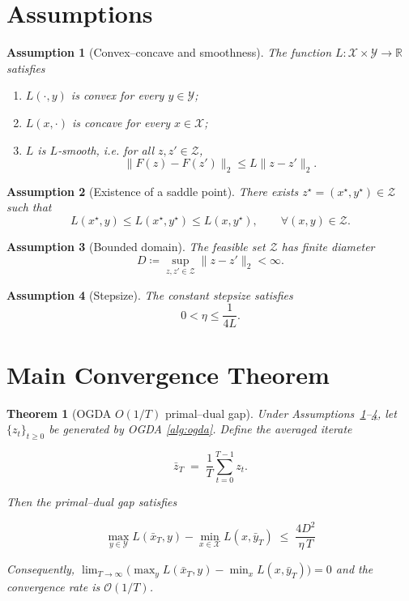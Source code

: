 \documentclass{article}
\newtheorem{theorem}{Theorem}
\newtheorem{assumption}{Assumption}
\newcommand{\R}{\mathbb{R}}
\begin{document}
\section{Assumptions}
\begin{assumption}[Convex–concave and smoothness]\label{ass:convexconcave}
The function $L:\mathcal X\times\mathcal Y\to\R$ satisfies
\begin{enumerate}[label=(\alph*)]
\item $L(\cdot,y)$ is convex for every $y\in\mathcal Y$;
\item $L(x,\cdot)$ is concave for every $x\in\mathcal X$;
\item $L$ is $L$‑smooth, i.e. for all $z,z'\in\mathcal Z$,
\[
\|F(z)-F(z')\|_2\le L\|z-z'\|_2 .
\]
\end{enumerate}
\end{assumption}

\begin{assumption}[Existence of a saddle point]\label{ass:saddle}
There exists $z^\star=(x^\star,y^\star)\in\mathcal Z$ such that
\[
L(x^\star,y)\le L(x^\star,y^\star)\le L(x,y^\star),\qquad\forall (x,y)\in\mathcal Z .
\]
\end{assumption}

\begin{assumption}[Bounded domain]\label{ass:bounded}
The feasible set $\mathcal Z$ has finite diameter 
\[
D\coloneqq\sup_{z,z'\in\mathcal Z}\|z-z'\|_2<\infty .
\]
\end{assumption}

\begin{assumption}[Stepsize]\label{ass:stepsize}
The constant stepsize satisfies 
\[
0<\eta\le\frac{1}{4L}.
\]
\end{assumption}

\section{Main Convergence Theorem}
\begin{theorem}[OGDA $O(1/T)$ primal–dual gap]\label{thm:ogda}
Under Assumptions~\ref{ass:convexconcave}–\ref{ass:stepsize}, let $\{z_t\}_{t\ge0}$ be generated by OGDA \eqref{alg:ogda}. Define the averaged iterate  

\[
\bar z_T\;=\;\frac{1}{T}\sum_{t=0}^{T-1}z_t .
\]

Then the primal–dual gap satisfies  

\[
\boxed{
\max_{y\in\mathcal Y}L(\bar x_T,y)-\min_{x\in\mathcal X}L(x,\bar y_T)
\;\le\;
\frac{4D^{2}}{\eta\,T}
}
\tag{2}
\]

Consequently, $\displaystyle\lim_{T\to\infty}\bigl(\max_{y}L(\bar x_T,y)-\min_{x}L(x,\bar y_T)\bigr)=0$ and the convergence rate is $\mathcal O(1/T)$.
\end{theorem}
\end{document}
